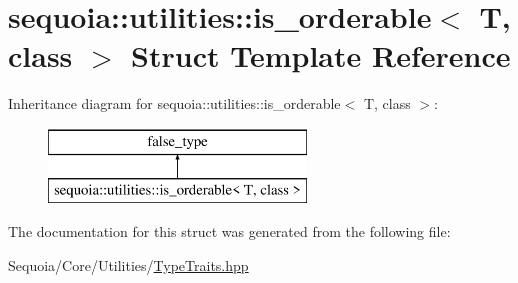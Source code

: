 \hypertarget{structsequoia_1_1utilities_1_1is__orderable}{}\section{sequoia\+::utilities\+::is\+\_\+orderable$<$ T, class $>$ Struct Template Reference}
\label{structsequoia_1_1utilities_1_1is__orderable}
Inheritance diagram for sequoia\+::utilities\+::is\+\_\+orderable$<$ T, class $>$\+:\begin{figure}[H]
\begin{center}
\leavevmode
\includegraphics[height=2.000000cm]{structsequoia_1_1utilities_1_1is__orderable}
\end{center}
\end{figure}


The documentation for this struct was generated from the following file\+:\begin{DoxyCompactItemize}
\item 
Sequoia/\+Core/\+Utilities/\mbox{\hyperlink{_type_traits_8hpp}{Type\+Traits.\+hpp}}\end{DoxyCompactItemize}
